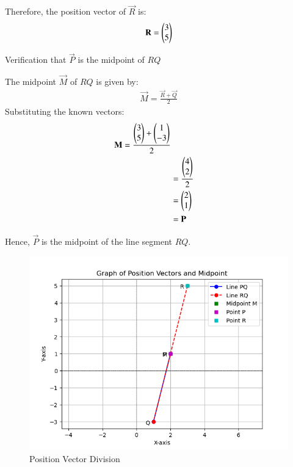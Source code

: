 \documentclass[journal]{IEEEtran}
\begin{document}
Therefore, the position vector of $\vec R$ is:
\begin{align}
\mathbf{R} = \begin{pmatrix}3\\5\end{pmatrix}
\end{align}

Verification that $\vec P$ is the midpoint of $RQ$

The midpoint $\vec M$ of $RQ$ is given by:
\begin{align}
\vec{M} = \frac{\vec{R} + \vec{Q}}{2}
\end{align}
Substituting the known vectors:
\begin{align}
\mathbf{M} = \frac{\begin{pmatrix}3\\5\end{pmatrix} + \begin{pmatrix}1\\-3\end{pmatrix}}{2} \\
&= \frac{\begin{pmatrix}4\\2\end{pmatrix}}{2} \\
&= \begin{pmatrix}2\\1\end{pmatrix} \\
&= \mathbf{P}
\end{align}

Hence, $\vec P$ is the midpoint of the line segment $RQ$.

\begin{figure}[h!]
   \centering
   \includegraphics[width=0.7\linewidth]{figs/graph.png}
   \caption{Position Vector Division}
\end{figure}
\end{document}
